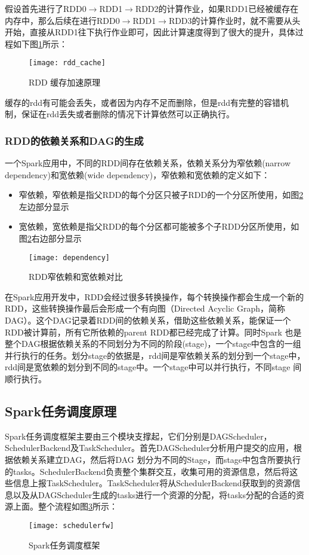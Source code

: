 假设首先进行了RDD0$\rightarrow$RDD1$\rightarrow$RDD2的计算作业，如果RDD1已经被缓存在内存中，那么后续在进行RDD0$\rightarrow$RDD1$\rightarrow$RDD3的计算作业时，就不需要从头开始，直接从RDD1往下执行作业即可，因此计算速度得到了很大的提升，具体过程如下图\ref{fig:rdd_cache}所示：
\begin{figure}[htp]
\centering
\texttt{[image: rdd\_cache]}
\caption{RDD 缓存加速原理}
\label{fig:rdd_cache}
\end{figure}

缓存的rdd有可能会丢失，或者因为内存不足而删除，但是rdd有完整的容错机制，保证在rdd丢失或者删除的情况下计算依然可以正确执行。
\subsubsection{RDD的依赖关系和DAG的生成}
一个Spark应用中，不同的RDD间存在依赖关系，依赖关系分为窄依赖(narrow dependency)和宽依赖(wide dependency)，窄依赖和宽依赖的定义如下：
\begin{itemize}
\item 窄依赖，窄依赖是指父RDD的每个分区只被子RDD的一个分区所使用，如图\ref{fig:dependency}左边部分显示
\item 宽依赖，宽依赖是指父RDD的每个分区都可能被多个子RDD分区所使用，如图\ref{fig:dependency}右边部分显示
\end{itemize}
\begin{figure}[htp]
\centering
\texttt{[image: dependency]}
\caption{RDD窄依赖和宽依赖对比}
\label{fig:dependency}
\end{figure}
在Spark应用开发中，RDD会经过很多转换操作，每个转换操作都会生成一个新的RDD，这些转换操作最后会形成一个有向图（Directed Acyclic Graph，简称DAG）。这个DAG记录着RDD间的依赖关系，借助这些依赖关系，能保证一个RDD被计算前，所有它所依赖的parent RDD都已经完成了计算。同时Spark 也是整个DAG根据依赖关系的不同划分为不同的阶段(stage)，一个stage中包含的一组并行执行的任务。划分stage的依据是，rdd间是窄依赖关系的划分到一个stage中，rdd间是宽依赖的划分到不同的stage中。一个stage中可以并行执行，不同stage 间顺行执行。
\subsection{Spark任务调度原理}
Spark任务调度框架主要由三个模块支撑起，它们分别是DAGScheduler，SchedulerBackend及TaskScheduler。首先DAGScheduler分析用户提交的应用，根据依赖关系建立DAG，然后将DAG 划分为不同的Stage，而stage中包含所要执行的tasks。SchedulerBackend负责整个集群交互，收集可用的资源信息，然后将这些信息上报TaskScheduler。TaskScheduler将从SchedulerBackend获取到的资源信息以及从DAGScheduler生成的tasks进行一个资源的分配，将tasks分配的合适的资源上面。整个流程如图\ref{fig:schedulerfw}所示：
\begin{figure}[htp]
\centering
\texttt{[image: schedulerfw]}
\caption{Spark任务调度框架}
\label{fig:schedulerfw}
\end{figure}

